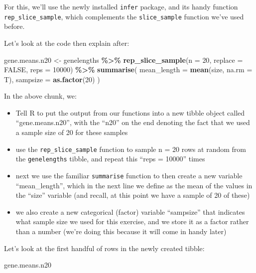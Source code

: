 \documentclass[
]{book}
\newenvironment{Shaded}{\begin{snugshade}}{\end{snugshade}}
\newcommand{\AttributeTok}[1]{\textcolor[rgb]{0.13,0.29,0.53}{#1}}
\newcommand{\ConstantTok}[1]{\textcolor[rgb]{0.56,0.35,0.01}{#1}}
\newcommand{\DecValTok}[1]{\textcolor[rgb]{0.00,0.00,0.81}{#1}}
\newcommand{\FunctionTok}[1]{\textcolor[rgb]{0.13,0.29,0.53}{\textbf{#1}}}
\newcommand{\NormalTok}[1]{#1}
\newcommand{\OtherTok}[1]{\textcolor[rgb]{0.56,0.35,0.01}{#1}}
\newcommand{\SpecialCharTok}[1]{\textcolor[rgb]{0.81,0.36,0.00}{\textbf{#1}}}
\providecommand{\tightlist}{%
  \setlength{\itemsep}{0pt}\setlength{\parskip}{0pt}}
\begin{document}
For this, we'll use the newly installed \texttt{infer} package, and its handy function \texttt{rep\_slice\_sample}, which complements the \texttt{slice\_sample} function we've used before.

Let's look at the code then explain after:

\begin{Shaded}
\begin{Highlighting}[]
\NormalTok{gene.means.n20 }\OtherTok{\textless{}{-}}\NormalTok{ genelengths }\SpecialCharTok{\%\textgreater{}\%}
  \FunctionTok{rep\_slice\_sample}\NormalTok{(}\AttributeTok{n =} \DecValTok{20}\NormalTok{, }\AttributeTok{replace =} \ConstantTok{FALSE}\NormalTok{, }\AttributeTok{reps =} \DecValTok{10000}\NormalTok{) }\SpecialCharTok{\%\textgreater{}\%}
  \FunctionTok{summarise}\NormalTok{(}
    \AttributeTok{mean\_length =} \FunctionTok{mean}\NormalTok{(size, }\AttributeTok{na.rm =}\NormalTok{ T),}
    \AttributeTok{sampsize =} \FunctionTok{as.factor}\NormalTok{(}\DecValTok{20}\NormalTok{)}
\NormalTok{  )}
\end{Highlighting}
\end{Shaded}

In the above chunk, we:

\begin{itemize}
\tightlist
\item
  Tell R to put the output from our functions into a new tibble object called ``gene.means.n20'', with the ``n20'' on the end denoting the fact that we used a sample size of 20 for these samples
\item
  use the \texttt{rep\_slice\_sample} function to sample n = 20 rows at random from the \texttt{genelengths} tibble, and repeat this ``reps = 10000'' times
\item
  next we use the familiar \texttt{summarise} function to then create a new variable ``mean\_length'', which in the next line we define as the mean of the values in the ``size'' variable (and recall, at this point we have a sample of 20 of these)
\item
  we also create a new categorical (factor) variable ``sampsize'' that indicates what sample size we used for this exercise, and we store it as a factor rather than a number (we're doing this because it will come in handy later)
\end{itemize}

Let's look at the first handful of rows in the newly created tibble:

\begin{Shaded}
\begin{Highlighting}[]
\NormalTok{gene.means.n20}
\end{Highlighting}
\end{Shaded}
\end{document}
